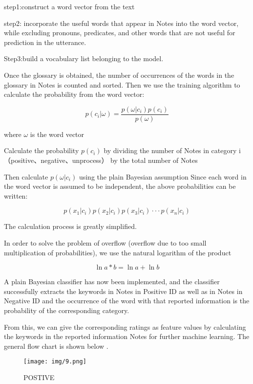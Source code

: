 \documentclass{mcmthesis}
\begin{document}
step1:construct a word vector from the text

step2: incorporate the useful words that appear in Notes into the word vector, while excluding pronouns, predicates, and other words that are not useful for prediction in the utterance.

Step3:build a vocabulary list belonging to the model. 

Once the glossary is obtained, the number of occurrences of the words in the glossary in Notes is counted and sorted. Then we use the training algorithm to calculate the probability from the word vector:

\begin{equation}
p(c_i|\omega)=\frac{p(\omega|c_i)p(c_i)}{p(\omega)}
\label{4}
\end{equation}

where $\omega$ is the word vector

Calculate the probability $p(c_i)$ by dividing the number of Notes in category i（positive、negative、unprocess） by the total number of Notes

Then calculate $p(\omega|c_i)$ using the plain Bayesian assumption Since each word in the word vector is assumed to be independent, the above probabilities can be written:

\begin{equation}
p(x_1|c_i)p(x_2|c_i)p(x_3|c_i)···p(x_n|c_i)
\label{5}
\end{equation}

The calculation process is greatly simplified.

In order to solve the problem of overflow (overflow due to too small multiplication of probabilities), we use the natural logarithm of the product

\begin{equation}
\ln{a*b}=\ln{a}+\ln{b}
\label{6}
\end{equation}

A plain Bayesian classifier has now been implemented, and the classifier successfully extracts the keywords in Notes in Positive ID as well as in Notes in Negative ID and the occurrence of the word with that reported information
is the probability of the corresponding category.

From this, we can give the corresponding ratings as feature values by calculating the keywords in the reported information Notes for further machine learning. The general flow chart is shown below .

\begin{figure}[h]
    \centering
    \texttt{[image: img/9.png]}
    \caption{POSTIVE}
    \label{POSTIVE}
\end{figure}
\end{document}
